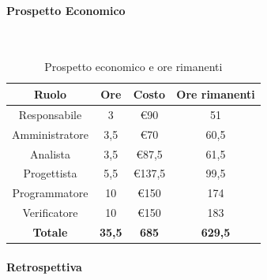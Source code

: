 \documentclass{article}
\begin{document}
                \paragraph{Prospetto Economico}\mbox{}\\
                \begin{table}[H]
                    \centering
                    \begin{tabular}{|c|c|c|c|}
                    \hline
                    \textbf{Ruolo}  & \textbf{Ore}  & \textbf{Costo} & \textbf{Ore rimanenti} \\ \hline
                    Responsabile    & 3             & €90            & 51                     \\ \hline
                    Amministratore  & 3,5           & €70            & 60,5                   \\ \hline
                    Analista        & 3,5           & €87,5          & 61,5                   \\ \hline
                    Progettista     & 5,5           & €137,5         & 99,5                   \\ \hline
                    Programmatore   & 10            & €150           & 174                    \\ \hline
                    Verificatore    & 10            & €150           & 183                    \\ \hline
                    \textbf{Totale} & \textbf{35,5} & \textbf{685}   & \textbf{629,5}         \\ \hline
                    \end{tabular}
                    \caption{Prospetto economico e ore rimanenti}
                \end{table}

                \paragraph{Retrospettiva}
\end{document}
